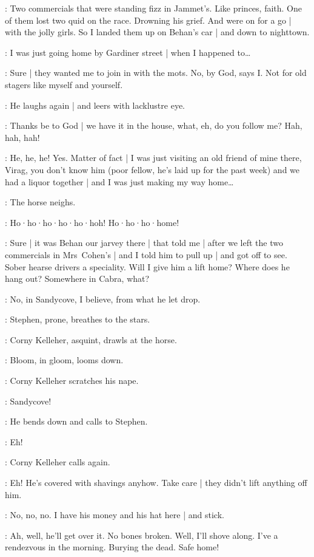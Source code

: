 \Corny:
Two commercials that were standing fizz in Jammet's.
Like princes,
faith.
One of them lost two quid on the race.
Drowning his grief.
And were on for a go |
with the jolly girls.
So I landed them up on Behan's car |
and down to nighttown.

\Bloom:
I was just going home by Gardiner street |
when I happened to…

\Corny:
Sure |
they wanted me to join in with the mots.
No,
by God,
says I.
Not for old stagers like myself and yourself.

:
He laughs again |
and leers with lacklustre eye.

\Corny:
Thanks be to God |
we have it in the house,
what,
eh,
do you follow me?
Hah,
hah,
hah!

\Bloom:
He,
he,
he!
Yes.
Matter of fact |
I was just visiting an old friend of mine there,
Virag,
you don't know him
(poor fellow,
he's laid up for the past week)
and we had a liquor together |
and I was just making my way home…

:
The horse neighs.

\Horse:
Ho·ho·ho·ho·ho·hoh!
Ho·ho·ho·home!

\Corny:
Sure |
it was Behan our jarvey there |
that told me |
after we left the two commercials in Mrs~Cohen's |
and I told him to pull up |
and got off to see.
Sober hearse drivers a speciality.
Will I give him a lift home?
Where does he hang out?
Somewhere in Cabra,
what?

\Bloom:
No,
in Sandycove,
I believe,
from what he let drop.

:
Stephen,
prone,
breathes to the stars.

:
Corny Kelleher,
asquint,
drawls at the horse.

:
Bloom,
in gloom,
looms down.

:
Corny Kelleher scratches his nape.

\Corny:
Sandycove!

:
He bends down and calls to Stephen.

\Corny:
Eh!

:
Corny Kelleher calls again.

\Corny:
Eh!
He's covered with shavings anyhow.
Take care |
they didn't lift anything off him.

\Bloom:
No,
no,
no.
I have his money and his hat here |
and stick.

\Corny:
Ah,
well,
he'll get over it.
No bones broken.
Well,
I'll shove along.
I've a rendezvous in the morning.
Burying the dead.
Safe home!


